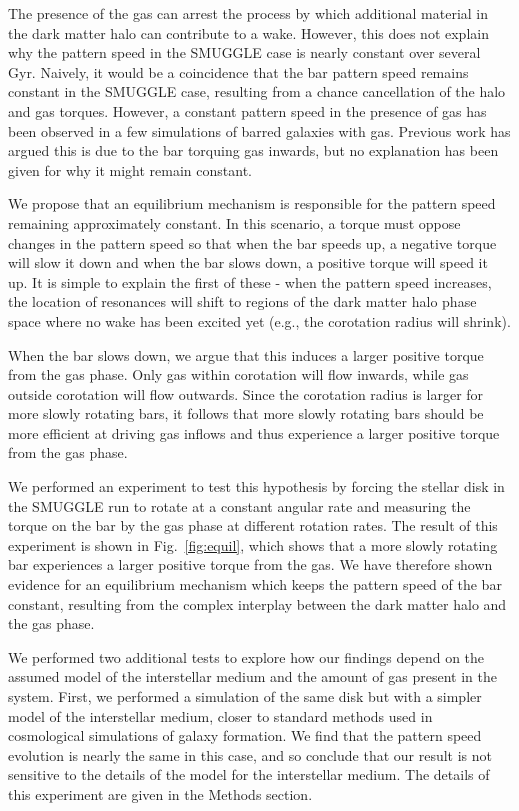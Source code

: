 \documentclass{natureprintstyle}
\begin{document}
The presence of the gas can arrest the process by which additional material in
the dark matter halo can contribute to a wake. However, this does not explain
why the pattern speed in the SMUGGLE case is nearly constant over several Gyr.
Naively, it would be a coincidence that the bar pattern speed remains constant
in the SMUGGLE case, resulting from a chance cancellation of the halo and gas
torques. However, a constant pattern speed in the presence of gas has been
observed in a few simulations of barred galaxies with
gas.\cite{1993AA...268...65F, 2010ApJ...719.1470V} Previous work has argued
this is due to the bar torquing gas inwards, but no explanation has been given
for why it might remain constant.

We propose that an equilibrium mechanism is responsible for the pattern speed
remaining approximately constant. In this scenario, a torque must oppose
changes in the pattern speed so that when the bar speeds up, a negative torque
will slow it down and when the bar slows down, a positive torque will speed it
up. It is simple to explain the first of these - when the pattern speed
increases, the location of resonances will shift to regions of the dark matter
halo phase space where no wake has been excited yet (e.g., the corotation
radius will shrink).

When the bar slows down, we argue that this induces a larger positive torque
from the gas phase. Only gas within corotation will flow inwards, while gas
outside corotation will flow outwards.\cite{2011MNRAS.415.1027H} Since the
corotation radius is larger for more slowly rotating bars, it follows that
more slowly rotating bars should be more efficient at driving gas inflows and
thus experience a larger positive torque from the gas phase.

We performed an experiment to test this hypothesis by forcing the stellar disk
in the SMUGGLE run to rotate at a constant angular rate and measuring the
torque on the bar by the gas phase at different rotation rates. The result of
this experiment is shown in Fig.~\ref{fig:equil}, which shows that a more
slowly rotating bar experiences a larger positive torque from the gas. We have
therefore shown evidence for an equilibrium mechanism which keeps the pattern
speed of the bar constant, resulting from the complex interplay between the
dark matter halo and the gas phase.

We performed two additional tests to explore how our findings depend on the
assumed model of the interstellar medium and the amount of gas present in the
system. First, we performed a simulation of the same disk but with a simpler
model of the interstellar medium\cite{2003MNRAS.339..289S}, closer to standard
methods used in cosmological simulations of galaxy formation. We find that the
pattern speed evolution is nearly the same in this case, and so conclude that
our result is not sensitive to the details of the model for the interstellar
medium. The details of this experiment are given in the Methods section.
\end{document}
